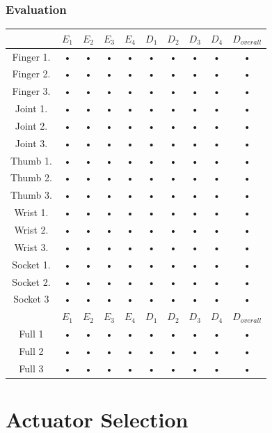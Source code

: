 \documentclass[12pt,3p]{report}
\begin{document}
	\section{Evaluation}
\begin{tabular}{|c|c|c|c|c|c|c|c|c||c|}
\hline 
 & $E_1$ & $E_2$ & $E_3$ & $E_4$ & $D_1$ & $D_2$ & $D_3$ & $D_4$ & $D_{overall}$ \\ 
\hline 
Finger 1. & • & • & • & • & • & • & • & • & •\\ 
\hline 
Finger 2. & • & • & • & • & • & • & • & • & •\\ 
\hline 
Finger 3. & • & • & • & • & • & • & • & • & •\\ 
\hline 
Joint 1. & • & • & • & • & • & • & • & • & •\\ 
\hline 
Joint 2. & • & • & • & • & • & • & • & • & •\\ 
\hline 
Joint 3. & • & • & • & • & • & • & • & • & •\\ 
\hline 
Thumb 1. & • & • & • & • & • & • & • & • & •\\ 
\hline 
Thumb 2. & • & • & • & • & • & • & • & • & •\\ 
\hline 
Thumb 3. & • & • & • & • & • & • & • & • & •\\ 
\hline 
Wrist 1. & • & • & • & • & • & • & • & • & •\\ 
\hline 
Wrist 2. & • & • & • & • & • & • & • & • & •\\ 
\hline 
Wrist 3. & • & • & • & • & • & • & • & • & •\\ 
\hline 
Socket 1. & • & • & • & • & • & • & • & • & •\\ 
\hline 
Socket 2. & • & • & • & • & • & • & • & • & •\\ 
\hline 
Socket 3 & • & • & • & • & • & • & • & • & •\\
\hline
\hline 
 & $E_1$ & $E_2$ & $E_3$ & $E_4$ & $D_1$ & $D_2$ & $D_3$ & $D_4$ & $D_{overall}$ \\
\hline 
Full 1 & • & • & • & • & • & • & • & • & • \\ 
\hline 
Full 2 & • & • & • & • & • & • & • & • & • \\ 
\hline 
Full 3 & • & • & • & • & • & • & • & • & • \\ 
\hline 
\end{tabular} 




\pagebreak
\part{Actuator Selection}
\end{document}
